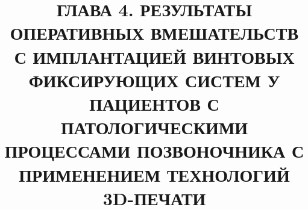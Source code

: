 
\title{
ГЛАВА 4. РЕЗУЛЬТАТЫ ОПЕРАТИВНЫХ ВМЕШАТЕЛЬСТВ С
ИМПЛАНТАЦИЕЙ ВИНТОВЫХ ФИКСИРУЮЩИХ СИСТЕМ У ПАЦИЕНТОВ
С ПАТОЛОГИЧЕСКИМИ ПРОЦЕССАМИ ПОЗВОНОЧНИКА С
ПРИМЕНЕНИЕМ ТЕХНОЛОГИЙ 3D-ПЕЧАТИ
}
